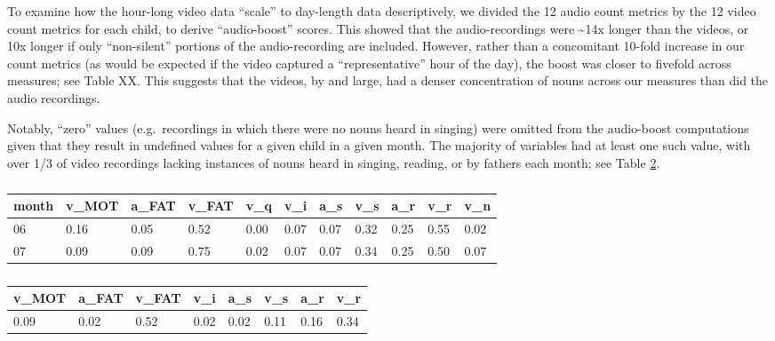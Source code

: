 \documentclass[floatsintext,man]{apa6}
\theoremstyle{definition}
\theoremstyle{definition}
\theoremstyle{definition}
\theoremstyle{remark}
\begin{document}
To examine how the hour-long video data \enquote{scale} to day-length
data descriptively, we divided the 12 audio count metrics by the 12
video count metrics for each child, to derive \enquote{audio-boost}
scores. This showed that the audio-recordings were \textasciitilde{}14x
longer than the videos, or 10x longer if only \enquote{non-silent}
portions of the audio-recording are included. However, rather than a
concomitant 10-fold increase in our count metrics (as would be expected
if the video captured a \enquote{representative} hour of the day), the
boost was closer to fivefold across measures; see Table XX. This
suggests that the videos, by and large, had a denser concentration of
nouns across our measures than did the audio recordings.

Notably, \enquote{zero} values (e.g.~recordings in which there were no
nouns heard in singing) were omitted from the audio-boost computations
given that they result in undefined values for a given child in a given
month. The majority of variables had at least one such value, with over
1/3 of video recordings lacking instances of nouns heard in singing,
reading, or by fathers each month; see Table
\ref{tab:propna-missing-tables}.

\begin{table}[tbp]
\begin{center}
\begin{threeparttable}
\caption{\label{tab:propna-missing-tables}}
\begin{tabular}{lllllllllll}
\toprule
month & \multicolumn{1}{c}{v\_MOT} & \multicolumn{1}{c}{a\_FAT} & \multicolumn{1}{c}{v\_FAT} & \multicolumn{1}{c}{v\_q} & \multicolumn{1}{c}{v\_i} & \multicolumn{1}{c}{a\_s} & \multicolumn{1}{c}{v\_s} & \multicolumn{1}{c}{a\_r} & \multicolumn{1}{c}{v\_r} & \multicolumn{1}{c}{v\_n}\\
\midrule
06 & 0.16 & 0.05 & 0.52 & 0.00 & 0.07 & 0.07 & 0.32 & 0.25 & 0.55 & 0.02\\
07 & 0.09 & 0.09 & 0.75 & 0.02 & 0.07 & 0.07 & 0.34 & 0.25 & 0.50 & 0.07\\
\bottomrule
\end{tabular}
\end{threeparttable}
\end{center}
\end{table}

\begin{table}[tbp]
\begin{center}
\begin{threeparttable}
\caption{\label{tab:propna-missing-tables}}
\begin{tabular}{llllllll}
\toprule
v\_MOT & \multicolumn{1}{c}{a\_FAT} & \multicolumn{1}{c}{v\_FAT} & \multicolumn{1}{c}{v\_i} & \multicolumn{1}{c}{a\_s} & \multicolumn{1}{c}{v\_s} & \multicolumn{1}{c}{a\_r} & \multicolumn{1}{c}{v\_r}\\
\midrule
0.09 & 0.02 & 0.52 & 0.02 & 0.02 & 0.11 & 0.16 & 0.34\\
\bottomrule
\end{tabular}
\end{threeparttable}
\end{center}
\end{table}
\end{document}
